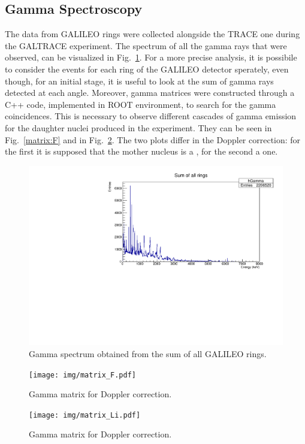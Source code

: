 \subsection{Gamma Spectroscopy}

The data from GALILEO rings were collected alongside the TRACE one during the
GALTRACE experiment. The spectrum of all the gamma rays that were observed,
can be visualized in Fig.~\ref{gamma}.
For a more precise analysis, it is possibile to consider the events for each
ring of the GALILEO detector sperately, even though, for an initial stage,
it is useful to look at the sum of gamma rays detected at each angle.
Moreover, gamma matrices were constructed through a C++ code,
implemented in ROOT environment, to search for the gamma coincidences.
This is necessary to observe different cascades of gamma emission for the
daughter nuclei produced in the experiment.
They can be seen in Fig.~\ref{matrix:F} and in Fig.~\ref{matrix:Li}.
The two plots differ in the Doppler correction: for the first it is supposed
that the mother nucleus is a , for the second a  one.

\begin{figure}[h]
  \centering
  \includegraphics[scale=.6]{img/gamma.pdf}
  \caption{Gamma spectrum obtained from the sum of all GALILEO rings.}
  \label{gamma}
\end{figure}

\begin{figure}[h]
  \centering
  \begin{minipage}[b]{0.4\textwidth}
    \vspace{5mm}
    \texttt{[image: img/matrix\_F.pdf]}
    \caption{Gamma matrix for  Doppler correction.}
    \label{matrix:F}
  \end{minipage}
  \hfill
  \begin{minipage}[b]{0.4\textwidth}
    \vspace{5mm}
    \texttt{[image: img/matrix\_Li.pdf]}
    \caption{Gamma matrix for  Doppler correction.}
    \label{matrix:Li}
  \end{minipage}
\end{figure}

